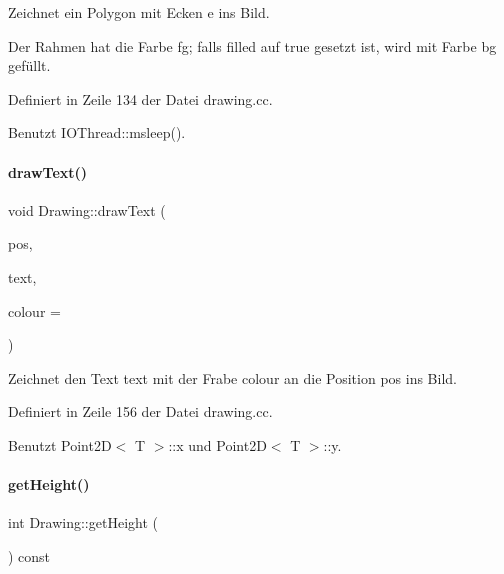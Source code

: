 Zeichnet ein Polygon mit Ecken {\ttfamily e} ins Bild. 

Der Rahmen hat die Farbe {\ttfamily fg}; falls {\ttfamily filled} auf {\ttfamily true} gesetzt ist, wird mit Farbe {\ttfamily bg} gefüllt. 

Definiert in Zeile 134 der Datei drawing.\+cc.



Benutzt I\+O\+Thread\+::msleep().

\mbox{\label{classDrawing_afa0ebabdcc81eb06d4b67e6bb83cdc4d}} 
\paragraph{\texorpdfstring{draw\+Text()}{drawText()}}
{\footnotesize\ttfamily void Drawing\+::draw\+Text (\begin{DoxyParamCaption}\item[{\mbox{\hyperlink{point2d_8h_aeeeb57e4186edb0a4274b64925e0d0fb}{I\+Point2D}}}]{pos,  }\item[{const std\+::string \&}]{text,  }\item[{\mbox{\hyperlink{classDrawColour}{Draw\+Colour}}}]{colour = {} }\end{DoxyParamCaption})}



Zeichnet den Text {\ttfamily text} mit der Frabe {\ttfamily colour} an die Position {\ttfamily pos} ins Bild. 



Definiert in Zeile 156 der Datei drawing.\+cc.



Benutzt Point2\+D$<$ T $>$\+::x und Point2\+D$<$ T $>$\+::y.

\mbox{\label{classDrawing_a7bd4dcf4718cf46a73d11e63dc7bc876}} 
\paragraph{\texorpdfstring{get\+Height()}{getHeight()}}
{\footnotesize\ttfamily int Drawing\+::get\+Height (\begin{DoxyParamCaption}{ }\end{DoxyParamCaption}) const\hspace{0.3cm}{\ttfamily [inline]}}




